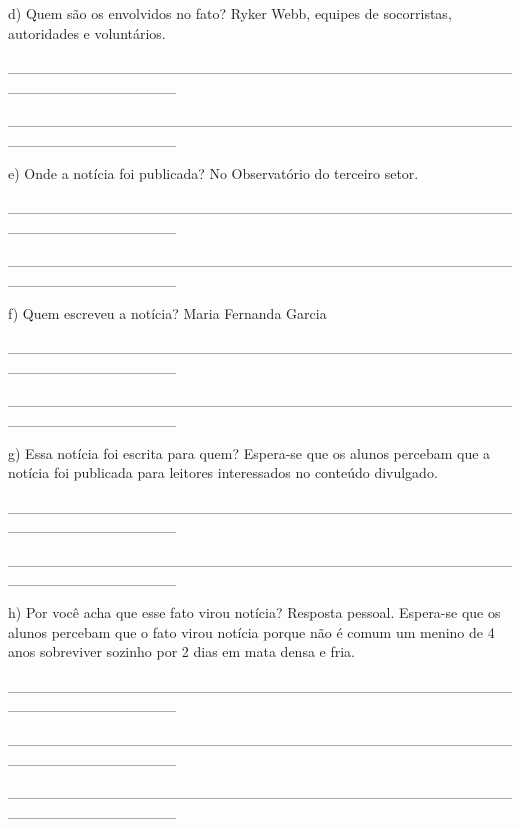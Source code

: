 \begin{itemize}
{{{\begin{itemize}
\begin{itemize}
\begin{itemize}
d) Quem são os envolvidos no fato? Ryker Webb, equipes de socorristas,
autoridades e voluntários.

\_\_\_\_\_\_\_\_\_\_\_\_\_\_\_\_\_\_\_\_\_\_\_\_\_\_\_\_\_\_\_\_\_\_\_\_\_\_\_\_\_\_\_\_\_\_\_\_\_\_\_\_\_\_\_\_\_\_\_\_\_\_\_\_

\_\_\_\_\_\_\_\_\_\_\_\_\_\_\_\_\_\_\_\_\_\_\_\_\_\_\_\_\_\_\_\_\_\_\_\_\_\_\_\_\_\_\_\_\_\_\_\_\_\_\_\_\_\_\_\_\_\_\_\_\_\_\_\_

e) Onde a notícia foi publicada? No Observatório do terceiro setor.

\_\_\_\_\_\_\_\_\_\_\_\_\_\_\_\_\_\_\_\_\_\_\_\_\_\_\_\_\_\_\_\_\_\_\_\_\_\_\_\_\_\_\_\_\_\_\_\_\_\_\_\_\_\_\_\_\_\_\_\_\_\_\_\_

\_\_\_\_\_\_\_\_\_\_\_\_\_\_\_\_\_\_\_\_\_\_\_\_\_\_\_\_\_\_\_\_\_\_\_\_\_\_\_\_\_\_\_\_\_\_\_\_\_\_\_\_\_\_\_\_\_\_\_\_\_\_\_\_

f) Quem escreveu a notícia? Maria Fernanda Garcia

\_\_\_\_\_\_\_\_\_\_\_\_\_\_\_\_\_\_\_\_\_\_\_\_\_\_\_\_\_\_\_\_\_\_\_\_\_\_\_\_\_\_\_\_\_\_\_\_\_\_\_\_\_\_\_\_\_\_\_\_\_\_\_\_

\_\_\_\_\_\_\_\_\_\_\_\_\_\_\_\_\_\_\_\_\_\_\_\_\_\_\_\_\_\_\_\_\_\_\_\_\_\_\_\_\_\_\_\_\_\_\_\_\_\_\_\_\_\_\_\_\_\_\_\_\_\_\_\_

g) Essa notícia foi escrita para quem? Espera-se que os alunos percebam
que a notícia foi publicada para leitores interessados no conteúdo
divulgado.

\_\_\_\_\_\_\_\_\_\_\_\_\_\_\_\_\_\_\_\_\_\_\_\_\_\_\_\_\_\_\_\_\_\_\_\_\_\_\_\_\_\_\_\_\_\_\_\_\_\_\_\_\_\_\_\_\_\_\_\_\_\_\_\_

\_\_\_\_\_\_\_\_\_\_\_\_\_\_\_\_\_\_\_\_\_\_\_\_\_\_\_\_\_\_\_\_\_\_\_\_\_\_\_\_\_\_\_\_\_\_\_\_\_\_\_\_\_\_\_\_\_\_\_\_\_\_\_\_

h) Por você acha que esse fato virou notícia? Resposta pessoal.
Espera-se que os alunos percebam que o fato virou notícia porque não é
comum um menino de 4 anos sobreviver sozinho por 2 dias em mata densa e
fria.

\_\_\_\_\_\_\_\_\_\_\_\_\_\_\_\_\_\_\_\_\_\_\_\_\_\_\_\_\_\_\_\_\_\_\_\_\_\_\_\_\_\_\_\_\_\_\_\_\_\_\_\_\_\_\_\_\_\_\_\_\_\_\_\_

\_\_\_\_\_\_\_\_\_\_\_\_\_\_\_\_\_\_\_\_\_\_\_\_\_\_\_\_\_\_\_\_\_\_\_\_\_\_\_\_\_\_\_\_\_\_\_\_\_\_\_\_\_\_\_\_\_\_\_\_\_\_\_\_

\_\_\_\_\_\_\_\_\_\_\_\_\_\_\_\_\_\_\_\_\_\_\_\_\_\_\_\_\_\_\_\_\_\_\_\_\_\_\_\_\_\_\_\_\_\_\_\_\_\_\_\_\_\_\_\_\_\_\_\_\_\_\_\_


\end{itemize}
\end{itemize}
\end{itemize}}}}
\end{itemize}
